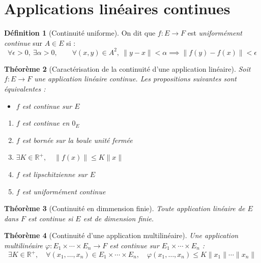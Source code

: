\documentclass[11pt,a4paper]{report}
\newtheorem{theorem}{Théorème}[chapter]
\newtheorem{itheorem}[theorem]{Théorème}
\theoremstyle{definition}
\newtheorem{dfn}[theorem]{Définition}
\begin{document}
\section{Applications linéaires continues} %
\label{sec:applications_lineaires_continues}
\begin{dfn}[Continuité uniforme]
     On dit que $f : E \to F$ est \emph{uniformément continue} sur $A\in E$ si : 
     \begin{equation}
     \forall \epsilon > 0, \: \exists \alpha > 0, \qquad \forall (x,y)\in A^2, \: \|y - x\| < \alpha \implies \| f(y) - f(x) \| < \epsilon
     \end{equation}
\end{dfn}
\begin{itheorem}[Caractérisation de la continuité d'une application linéaire]
    Soit $f : E \to F$ une application linéaire continue. Les propositions suivantes sont équivalentes : 
    \begin{itemize}
           \item $f$ est continue sur $E$
    \end{itemize}
    \begin{enumerate}
           \item $f$ est continue en $0_E$
           \item $f$ est bornée sur la boule unité fermée
           \item $\exists K \in \ensuremath{\mathbb{R}}^+,\quad \| f(x) \| \le K\| x\|$ 
           \item $f$ est lipschitzienne sur $E$
           \item $f$ est uniformément continue
    \end{enumerate}   
\end{itheorem}
\begin{theorem}[Continuité en dimmension finie]
     Toute application linéaire de $E$ dans $F$ est continue si $E$ est de dimension finie.
\end{theorem}
\begin{theorem}[Continuité d'une application multilinéaire]
     Une application multilinéaire $\varphi : E_1 \times \cdots \times E_n \longrightarrow F$ est continue sur $E_1 \times \cdots \times E_n$ \Longleftrightarrow : 
     \begin{equation}
          \exists K\in \ensuremath{\mathbb{R}}^+, \quad \forall (x_1, \ldots , x_n) \in E_1 \times \cdots \times E_n , \quad \varphi (x_1, \ldots , x_n) \le K \| x_1\| \cdots \| x_n \|
     \end{equation}
\end{theorem}
\end{document}
